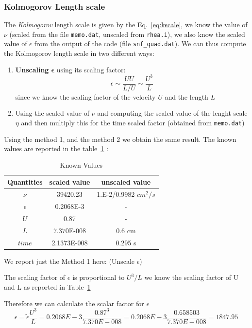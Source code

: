\subsubsection{Kolmogorov Length scale}

The \textit{Kolmogorov} length scale is given by the Eq.~\ref{eq:kscale},
we know the value of $\nu$ (scaled from the file \verb|memo.dat|, unscaled from \verb|rhea.i|), we also know the scaled value of $\epsilon$ from the output of the code (file \verb|snf_quad.dat|). We can thus compute the Kolmogorov length scale in two different ways:
\begin{enumerate}

\item \textbf{Unscaling} $\mathbf\epsilon$ using its scaling factor:
$$\epsilon \sim \frac{UU}{L/U} \sim \frac{U^3}{L} $$
since we know the scaling factor of the velocity $U$ and the length $L$

\item Using the scaled value of $\nu$ and computing the scaled value of the lenght scale $\eta$ and then multiply this for the time scaled factor (obtained from \verb|memo.dat|)  

\end{enumerate}

Using the method 1, and the method 2 we obtain the same result. 
The known values are reported in the table~\ref{value} :

\begin{table}[h]
\centering
\caption{Known Values}
\label{value}
\begin{tabular}{ccc}
\hline
\textbf{Quantities} &scaled value  &unscaled value  \\
\hline
$\nu$ & 39420.23  &  1.E-2/0.9982 $cm^2/s$    \\
$\epsilon $ &0.2068E-3  & -     \\
$U$                 &0.87   & - \\
$L$             & 7.370E-008 & 0.6 cm \\
$time$          & 2.1373E-008 & 0.295 s \\ 
\end{tabular}
\end{table}


We report just the Method 1 here: (Unscale $\epsilon$)

The scaling factor of $\epsilon$ is proportional to $U^3/L$ we know 
the scaling factor of U and L as reported in Table~\ref{value} 

Therefore we can calculate the scalar factor for $\epsilon$
\begin{equation}
\epsilon = \tilde{\epsilon}  \frac{U^3}{L}  =  0.2068E-3   \frac{0.87^3}{7.370E-008} = 0.2068E-3 \frac{0.658503}{7.370E-008} = 1847.95 
\end{equation} 

